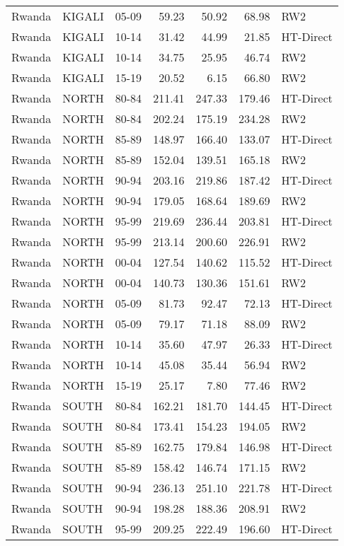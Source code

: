 \begin{longtable}{lllrrrl}
  Rwanda & KIGALI & 05-09 & 59.23 & 50.92 & 68.98 & RW2 \\ 
  Rwanda & KIGALI & 10-14 & 31.42 & 44.99 & 21.85 & HT-Direct \\ 
  Rwanda & KIGALI & 10-14 & 34.75 & 25.95 & 46.74 & RW2 \\ 
  Rwanda & KIGALI & 15-19 & 20.52 & 6.15 & 66.80 & RW2 \\ 
  Rwanda & NORTH & 80-84 & 211.41 & 247.33 & 179.46 & HT-Direct \\ 
  Rwanda & NORTH & 80-84 & 202.24 & 175.19 & 234.28 & RW2 \\ 
  Rwanda & NORTH & 85-89 & 148.97 & 166.40 & 133.07 & HT-Direct \\ 
  Rwanda & NORTH & 85-89 & 152.04 & 139.51 & 165.18 & RW2 \\ 
  Rwanda & NORTH & 90-94 & 203.16 & 219.86 & 187.42 & HT-Direct \\ 
  Rwanda & NORTH & 90-94 & 179.05 & 168.64 & 189.69 & RW2 \\ 
  Rwanda & NORTH & 95-99 & 219.69 & 236.44 & 203.81 & HT-Direct \\ 
  Rwanda & NORTH & 95-99 & 213.14 & 200.60 & 226.91 & RW2 \\ 
  Rwanda & NORTH & 00-04 & 127.54 & 140.62 & 115.52 & HT-Direct \\ 
  Rwanda & NORTH & 00-04 & 140.73 & 130.36 & 151.61 & RW2 \\ 
  Rwanda & NORTH & 05-09 & 81.73 & 92.47 & 72.13 & HT-Direct \\ 
  Rwanda & NORTH & 05-09 & 79.17 & 71.18 & 88.09 & RW2 \\ 
  Rwanda & NORTH & 10-14 & 35.60 & 47.97 & 26.33 & HT-Direct \\ 
  Rwanda & NORTH & 10-14 & 45.08 & 35.44 & 56.94 & RW2 \\ 
  Rwanda & NORTH & 15-19 & 25.17 & 7.80 & 77.46 & RW2 \\ 
  Rwanda & SOUTH & 80-84 & 162.21 & 181.70 & 144.45 & HT-Direct \\ 
  Rwanda & SOUTH & 80-84 & 173.41 & 154.23 & 194.05 & RW2 \\ 
  Rwanda & SOUTH & 85-89 & 162.75 & 179.84 & 146.98 & HT-Direct \\ 
  Rwanda & SOUTH & 85-89 & 158.42 & 146.74 & 171.15 & RW2 \\ 
  Rwanda & SOUTH & 90-94 & 236.13 & 251.10 & 221.78 & HT-Direct \\ 
  Rwanda & SOUTH & 90-94 & 198.28 & 188.36 & 208.91 & RW2 \\ 
  Rwanda & SOUTH & 95-99 & 209.25 & 222.49 & 196.60 & HT-Direct \\ 

\end{longtable}
